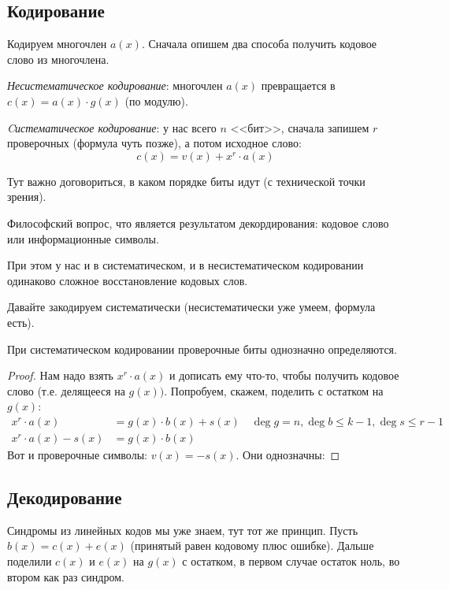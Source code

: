 \subsection{Кодирование}
Кодируем многочлен $a(x)$.
Сначала опишем два способа получить кодовое слово из многочлена.

\begin{Def}
	\textit{Несистематическое кодирование}:
	многочлен $a(x)$ превращается в $c(x) = a(x) \cdot g(x)$ (по модулю).
\end{Def}

\begin{Def}
	\textit{Cистематическое кодирование}: у нас всего $n$ <<бит>>,
	сначала запишем $r$ проверочных (формула чуть позже), а потом исходное слово:
	\[
		c(x) = v(x) + x^r \cdot a(x)
	\]
\end{Def}
\begin{Rem}
Тут важно договориться, в каком порядке биты идут (с технической точки зрения).
\end{Rem}
\begin{Rem}
Философский вопрос, что является результатом декордирования:
кодовое слово или информационные символы.
\end{Rem}
При этом у нас и в систематическом, и в несистематическом кодировании
одинаково сложное восстановление кодовых слов.

Давайте закодируем систематически (несистематически уже умеем, формула есть).
\begin{lemma}
	При систематическом кодировании проверочные биты однозначно определяются.
\end{lemma}
\begin{proof}
	Нам надо взять $x^r \cdot a(x)$ и дописать ему что-то, чтобы получить кодовое слово
	(т.е. делящееся на $g(x))$.
	Попробуем, скажем, поделить с остатком на $g(x)$:
	\begin{align*}
		x^r \cdot a(x) &= g(x) \cdot b(x) + s(x) \quad \deg g = n, \deg b \le k - 1, \deg s \le r - 1 \\
		x^r \cdot a(x) - s(x) &= g(x) \cdot b(x)
	\end{align*}
	Вот и проверочные символы: $v(x)=-s(x)$.
	Они однозначны: \TODO
\end{proof}

\subsection{Декодирование}
Синдромы из линейных кодов мы уже знаем, тут тот же принцип.
Пусть $b(x)=c(x)+e(x)$ (принятый равен кодовому плюс ошибке).
Дальше поделили $c(x)$ и $e(x)$ на $g(x)$ с остатком, в первом случае остаток ноль,
во втором как раз синдром.

